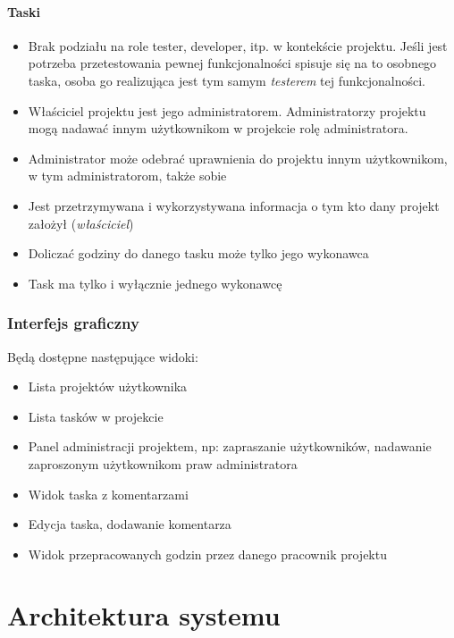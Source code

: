 \documentclass[a4paper,12pt,notitlepage]{mwrep}
\begin{document}
\subsubsection{Taski}
\begin{itemize}
	\item	Brak podziału na role tester, developer, itp. w kontekście projektu.
			Jeśli jest potrzeba przetestowania pewnej funkcjonalności spisuje się na to osobnego taska,
			osoba go realizująca jest tym samym \emph{testerem} tej funkcjonalności.
	\item	Właściciel projektu jest jego administratorem. Administratorzy projektu mogą nadawać innym
			użytkownikom w projekcie rolę administratora.
	\item	Administrator może odebrać uprawnienia do projektu innym użytkownikom, w tym administratorom,
			także sobie
	\item	Jest przetrzymywana i wykorzystywana informacja o tym kto dany projekt założył (\emph{właściciel})
	\item	Doliczać godziny do danego tasku może tylko jego wykonawca
	\item	Task ma tylko i wyłącznie jednego wykonawcę
\end{itemize}


\subsection{Interfejs graficzny}
Będą dostępne następujące widoki:
\begin{itemize}
	\item	Lista projektów użytkownika
	\item	Lista tasków w projekcie
	\item	Panel administracji projektem, np: zapraszanie użytkowników,
			nadawanie zaproszonym użytkownikom praw administratora
	\item	Widok taska z komentarzami
	\item	Edycja taska, dodawanie komentarza
	\item	Widok przepracowanych godzin przez danego pracownik projektu
\end{itemize}


\chapter{Architektura systemu}
\end{document}

